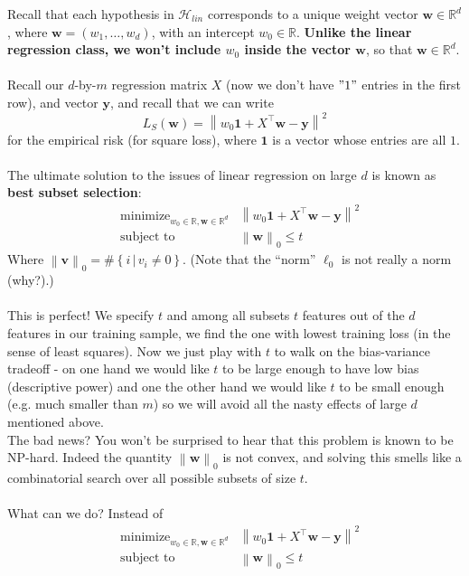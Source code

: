 \documentclass[11pt]{article}
\newcommand{\norm}[1]{\left\| #1\right\|}
\newcommand{\R}{\ensuremath{\mathbb{R}}}
\newcommand{\Tr}{\ensuremath{\top}}
\newcommand{\Hc}{\mathcal{H}}
\newcommand{\V}[1]{\mathbf{#1}}
\begin{document}
    Recall that each hypothesis in $\Hc_{lin}$ corresponds to a unique weight
    vector $\V{w}\in\R^{d}$, where $\V{w}=(w_1,\ldots,w_d)$, with an intercept
    $w_0\in\R$. {\bf Unlike the linear regression class, we won't include $w_0$
    inside the vector $\V{w}$}, so that $\V{w}\in\R^d$.
   \\~\\ 
    Recall our $d$-by-$m$ regression matrix $X$ (now we don't have $"1"$ entries in the first
row), and vector $\V{y}$, and recall that we can write
\[
  L_S(\V{w}) = \norm{ w_0\mathbf{1} + X^\Tr\V{w} -\V{y}}^2
\]
for the empirical risk (for square loss), where $\mathbf{1}$ is a vector whose entries are all $1$. 
\\~\\
    The ultimate solution to the issues of linear regression on large $d$
    is known as {\bf best subset selection}:
\begin{eqnarray*}
  & \text{minimize}_{w_0\in\R,\V{w}\in\R^{d}}   &  \norm{  w_0\mathbf{1} + X^\Tr\V{w} -\V{y}  }^2 \\
      & \text{subject to} &  \norm{\V{w}}_0 \leq t
    \end{eqnarray*}
    Where $\norm{\V{v}}_0 = \#\left\{ i\,|\, v_i\neq 0 \right\}$. 
    (Note that the ``norm'' $\ell_0$ is not really a norm (why?).)
\\~\\
This is perfect! We specify $t$ and among all subsets $t$ features out of the $d$
features in our training sample, we find the one with lowest training loss (in the sense of
least squares). Now we just play with $t$ to walk on the bias-variance tradeoff
- on one hand we would like $t$ to be large enough to have low bias (descriptive
power) and one the other hand we would like $t$ to be small enough (e.g. much smaller than
$m$) so we will avoid all the nasty effects of large $d$ mentioned above. 
~\\ The bad news? You won't be surprised to hear that this problem is known to
be NP-hard. Indeed the quantity $\norm{\V{w}}_0$ is not convex, and solving this
smells like a combinatorial search over all possible subsets of size $t$.
\\~\\
What can we do?
Instead of 
\begin{eqnarray*}
  & \text{minimize}_{w_0\in\R,\V{w}\in\R^{d}}   &  \norm{  w_0\mathbf{1} + X^\Tr\V{w} -\V{y}  }^2 \\
      & \text{subject to} &  \norm{\V{w}}_0 \leq t
    \end{eqnarray*}
\end{document}
